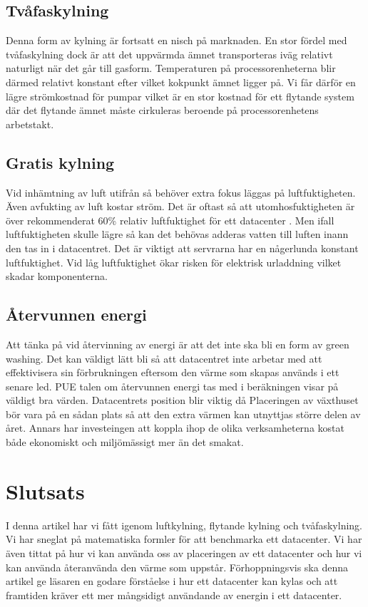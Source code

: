 \documentclass[conference,a4paper]{IEEEtran}
\begin{document}
\subsection{Tvåfaskylning}
Denna form av kylning är fortsatt en nisch på marknaden. En stor fördel med tvåfaskylning dock är att det uppvärmda ämnet transporteras
iväg relativt naturligt när det går till gasform. Temperaturen på processorenheterna blir därmed relativt konstant efter vilket 
kokpunkt ämnet ligger på. Vi får därför en lägre strömkostnad för pumpar vilket är en stor kostnad för ett flytande system där det flytande
ämnet måste cirkuleras beroende på processorenhetens arbetstakt. 
\subsection{Gratis kylning}
Vid inhämtning av luft utifrån så behöver extra fokus läggas på luftfuktigheten. Även avfukting av luft kostar ström. Det är oftast så att 
utomhosfuktigheten är över rekommenderat 60\% relativ luftfuktighet för ett datacenter \cite{energy3}. Men ifall luftfuktigheten skulle lägre så kan 
det behövas adderas vatten till luften inann den tas in i datacentret. Det är viktigt att servrarna har en någerlunda konstant 
luftfuktighet. Vid låg luftfuktighet ökar risken för elektrisk urladdning vilket skadar komponenterna. 
\subsection{Återvunnen energi}
Att tänka på vid återvinning av energi är att det inte ska bli en form av green washing. Det kan väldigt lätt bli så att datacentret inte arbetar 
med att effektivisera sin förbrukningen eftersom den värme som skapas används i ett senare led. PUE talen om återvunnen energi tas med i beräkningen 
visar på väldigt bra värden. Datacentrets position blir viktig då Placeringen av växthuset bör vara på en sådan plats så att den extra värmen kan 
utnyttjas större delen av året. Annars har investeingen att koppla ihop de olika verksamheterna kostat både ekonomiskt och miljömässigt mer än det smakat.
\section{Slutsats}
I denna artikel har vi fått igenom luftkylning, flytande kylning och tvåfaskylning. Vi har sneglat på matematiska formler för att benchmarka ett datacenter. 
Vi har även tittat på hur vi kan använda oss av placeringen av ett datacenter och hur vi kan använda återanvända den värme som uppstår. Förhoppningsvis ska denna 
artikel ge läsaren en godare förståelse i hur ett datacenter kan kylas och att framtiden kräver ett mer mångsidigt användande av energin i ett datacenter. 

\printbibliography
\end{document}
